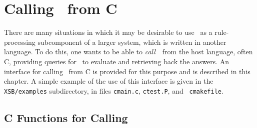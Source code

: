 \chapter{Calling \ourprolog\ from C}
\label{ccallingxsb}

There are many situations in which it may be desirable to use
\ourprolog\ as a rule-processing subcomponent of a larger system,
which is written in another language.  To do this, one wants to be
able to {\em call}\ \ourprolog\ from the host language, often C,
providing queries for \ourprolog\ to evaluate and retrieving back the
answers.  An interface for calling \ourprolog\ from C is provided for
this purpose and is described in this chapter.  A simple example of
the use of this interface is given in the {\tt XSB/examples}
subdirectory, in files {\tt cmain.c}, {\tt ctest.P}, and {\tt
cmakefile}.

\section{C Functions for Calling \ourprolog}

